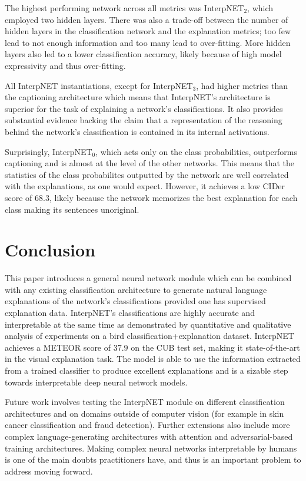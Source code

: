 \documentclass{article}
\begin{document}
The highest performing network across all metrics was InterpNET$_2$, which employed two hidden layers. There was also a trade-off between the number of hidden layers in the classification network and the explanation metrics; too few lead to not enough information and too many lead to over-fitting. More hidden layers also led to a lower classification accuracy, likely because of high model expressivity and thus over-fitting.

All InterpNET instantiations, except for InterpNET$_3$, had higher metrics than the captioning architecture which means that InterpNET's architecture is superior for the task of explaining a network's classifications. It also provides substantial evidence backing the claim that a representation of the reasoning behind the network's classification is contained in its internal activations.

Surprisingly, InterpNET$_0$, which acts only on the class probabilities, outperforms captioning and is almost at the level of the other networks. This means that the statistics of the class probabilites outputted by the network are well correlated with the explanations, as one would expect. However, it achieves a low CIDer score of $68.3$, likely because the network memorizes the best explanation for each class making its sentences unoriginal.

\section{Conclusion}

This paper introduces a general neural network module which can be combined with any existing classification architecture to generate natural language explanations of the network's classifications provided one has supervised explanation data. InterpNET's classifications are highly accurate and interpretable at the same time as demonstrated by quantitative and qualitative analysis of experiments on a bird classification+explanation dataset. InterpNET achieves a METEOR score of $37.9$ on the CUB test set, making it state-of-the-art in the visual explanation task. The model is able to use the information extracted from a trained classifier to produce excellent explanations and is a sizable step towards interpretable deep neural network models.

Future work involves testing the InterpNET module on different classification architectures and on domains outside of computer vision (for example in skin cancer classification and fraud detection). Further extensions also include more complex language-generating architectures with attention and adversarial-based training architectures. Making complex neural networks interpretable by humans is one of the main doubts practitioners have, and thus is an important problem to address moving forward.
\end{document}
